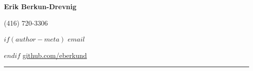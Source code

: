 \noindent
\begin{minipage}[b]{0.6\textwidth}
\Huge\textbf{Erik Berkun-Drevnig}
\end{minipage}
\begin{minipage}[b]{0.4\textwidth}
\begin{flushright}%
(416) 720-3306\par
$if(author-meta)$
\href{mailto:$email$}{$email$}\par
$endif$
\href{https://github.com/eberkund}{github.com/eberkund}\par
\end{flushright}
\end{minipage}
\smallskip
\hrule
